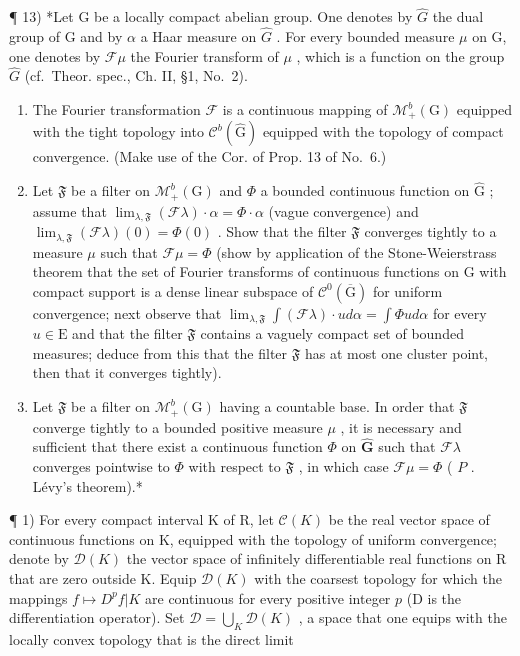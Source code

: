 ¶ 13) *Let G be a locally compact abelian group. One denotes by \(\widehat{G}\) the dual group of G and by \(\alpha\) a Haar measure on \(\widehat{G}\) . For every bounded measure \(\mu\) on G, one denotes by \(\mathcal{F}\mu\) the Fourier transform of \(\mu\) , which is a function on the group \(\widehat{G}\) (cf.~Theor. spec., Ch. II, §1, No.~2).

\begin{enumerate}
\def\labelenumi{\alph{enumi})}
\item
  The Fourier transformation \(\mathcal{F}\) is a continuous mapping of \(\mathcal{M}_{+}^{b}(\mathrm{G})\) equipped with the tight topology into \(\mathcal{C}^b (\widehat{\mathrm{G}})\) equipped with the topology of compact convergence. (Make use of the Cor. of Prop. 13 of No.~6.)
\item
  Let \(\mathfrak{F}\) be a filter on \(\mathcal{M}_+^b (\mathrm{G})\) and \(\Phi\) a bounded continuous function on \(\widehat{\mathrm{G}}\) ; assume that \(\lim_{\lambda ,\mathfrak{F}}(\mathcal{F}\lambda)\cdot \alpha = \Phi \cdot \alpha\) (vague convergence) and \(\lim_{\lambda ,\mathfrak{F}}(\mathcal{F}\lambda)(0) = \Phi (0)\) . Show that the filter \(\mathfrak{F}\) converges tightly to a measure \(\mu\) such that \(\mathcal{F}\mu = \Phi\) (show by application of the Stone-Weierstrass theorem that the set of Fourier transforms of continuous functions on G with compact support is a dense linear subspace of \(\mathcal{C}^0 (\overline{\mathrm{G}})\) for uniform convergence; next observe that \(\lim_{\lambda ,\mathfrak{F}}\int (\mathcal{F}\lambda)\cdot u d\alpha = \int \Phi u d\alpha\) for every \(u\in \mathrm{E}\) and that the filter \(\mathfrak{F}\) contains a vaguely compact set of bounded measures; deduce from this that the filter \(\mathfrak{F}\) has at most one cluster point, then that it converges tightly).
\item
  Let \(\mathfrak{F}\) be a filter on \(\mathcal{M}_{+}^{b}(\mathrm{G})\) having a countable base. In order that \(\mathfrak{F}\) converge tightly to a bounded positive measure \(\mu\) , it is necessary and sufficient that there exist a continuous function \(\Phi\) on \(\widehat{\mathbf{G}}\) such that \(\mathcal{F}\lambda\) converges pointwise to \(\Phi\) with respect to \(\mathfrak{F}\) , in which case \(\mathcal{F}\mu = \Phi\) ( \(P\) . Lévy's theorem).*
\end{enumerate}

\exercisesection{}

¶ 1) For every compact interval K of R, let \(\mathcal{C}(K)\) be the real vector space of continuous functions on K, equipped with the topology of uniform convergence; denote by \(\mathcal{D}(K)\) the vector space of infinitely differentiable real functions on R that are zero outside K. Equip \(\mathcal{D}(K)\) with the coarsest topology for which the mappings \(f \mapsto D^{p}f|K\) are continuous for every positive integer \(p\) (D is the differentiation operator). Set \(\mathcal{D} = \bigcup_{K} \mathcal{D}(K)\) , a space that one equips with the locally convex topology that is the direct limit

